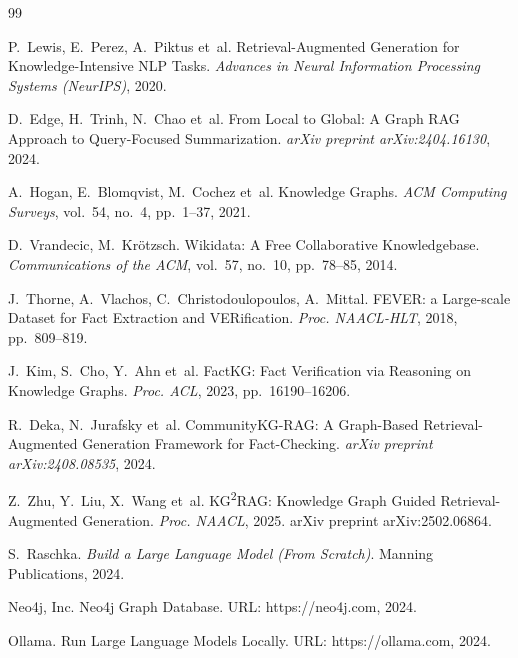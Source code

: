 \documentclass{misisarticle}
\begin{document}
\begin{thebibliography}{99}

P.~Lewis, E.~Perez, A.~Piktus et~al.
Retrieval-Augmented Generation for Knowledge-Intensive NLP Tasks.
\textit{Advances in Neural Information Processing Systems (NeurIPS)},
2020.

D.~Edge, H.~Trinh, N.~Chao et~al.
From Local to Global: A Graph RAG Approach
to Query-Focused Summarization.
\textit{arXiv preprint arXiv:2404.16130}, 2024.

A.~Hogan, E.~Blomqvist, M.~Cochez et~al.
Knowledge Graphs.
\textit{ACM Computing Surveys}, vol.~54, no.~4,
pp.~1--37, 2021.

D.~Vrandecic, M.~Kr{\"o}tzsch.
Wikidata: A Free Collaborative Knowledgebase.
\textit{Communications of the ACM}, vol.~57, no.~10,
pp.~78--85, 2014.

J.~Thorne, A.~Vlachos, C.~Christodoulopoulos, A.~Mittal.
FEVER: a Large-scale Dataset for Fact Extraction
and VERification.
\textit{Proc. NAACL-HLT}, 2018, pp.~809--819.

J.~Kim, S.~Cho, Y.~Ahn et~al.
FactKG: Fact Verification via Reasoning
on Knowledge Graphs.
\textit{Proc. ACL}, 2023, pp.~16190--16206.

R.~Deka, N.~Jurafsky et~al.
CommunityKG-RAG: A Graph-Based Retrieval-Augmented
Generation Framework for Fact-Checking.
\textit{arXiv preprint arXiv:2408.08535}, 2024.

Z.~Zhu, Y.~Liu, X.~Wang et~al.
KG\textsuperscript{2}RAG: Knowledge Graph Guided
Retrieval-Augmented Generation.
\textit{Proc. NAACL}, 2025.
arXiv preprint arXiv:2502.06864.

S.~Raschka.
\textit{Build a Large Language Model (From Scratch)}.
Manning Publications, 2024.

Neo4j, Inc.
Neo4j Graph Database.
URL: https://neo4j.com, 2024.

Ollama.
Run Large Language Models Locally.
URL: https://ollama.com, 2024.

\end{thebibliography}
\end{document}
